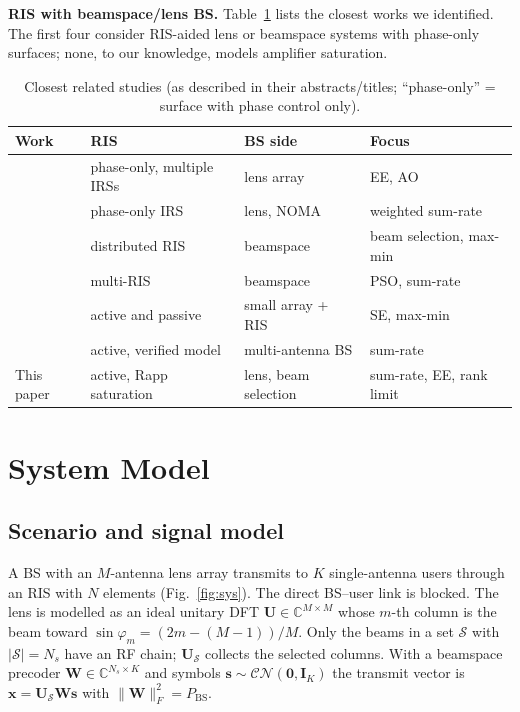 \documentclass{ieeeaccess}
\newcommand{\CN}{\mathcal{CN}}
\begin{document}
\textbf{RIS with beamspace/lens BS.} Table~\ref{tab:rel} lists the closest works we identified. The first four consider RIS-aided lens or beamspace systems with phase-only surfaces; none, to our knowledge, models amplifier saturation.

\begin{table}[t]\centering\caption{Closest related studies (as described in their abstracts/titles; ``phase-only'' = surface with phase control only).}\label{tab:rel}\small
\setlength{\tabcolsep}{3pt}\begin{tabular}{@{}>{\raggedright\arraybackslash}p{1.25cm}>{\raggedright\arraybackslash}p{2.1cm}>{\raggedright\arraybackslash}p{2.2cm}>{\raggedright\arraybackslash}p{2.3cm}@{}}\toprule
Work & RIS & BS side & Focus\\\midrule
\cite{wanggc2020} & phase-only, multiple IRSs & lens array & EE, AO\\
\cite{liu2021} & phase-only IRS & lens, NOMA & weighted sum-rate\\
\cite{pal2023} & distributed RIS & beamspace & beam selection, max-min\\
\cite{abdullah2025} & multi-RIS & beamspace & PSO, sum-rate\\
\cite{interdonato2024} & active and passive & small array + RIS & SE, max-min\\
\cite{zhang2023} & active, verified model & multi-antenna BS & sum-rate\\
This paper & active, Rapp saturation & lens, beam selection & sum-rate, EE, rank limit\\\bottomrule
\end{tabular}\end{table}

\section{System Model}\label{sec:sys}
\subsection{Scenario and signal model}
A BS with an $M$-antenna lens array transmits to $K$ single-antenna users through an RIS with $N$ elements (Fig.~\ref{fig:sys}). The direct BS--user link is blocked. The lens is modelled as an ideal unitary DFT $\mathbf U\in\mathbb C^{M\times M}$ whose $m$-th column is the beam toward $\sin\varphi_m=(2m-(M-1))/M$. Only the beams in a set $\mathcal S$ with $|\mathcal S|=N_s$ have an RF chain; $\mathbf U_{\mathcal S}$ collects the selected columns. With a beamspace precoder $\mathbf W\in\mathbb C^{N_s\times K}$ and symbols $\mathbf s\sim\CN(\mathbf 0,\mathbf I_K)$ the transmit vector is $\mathbf x=\mathbf U_{\mathcal S}\mathbf W\mathbf s$ with $\|\mathbf W\|_F^2=P_\mathrm{BS}$.
\end{document}
